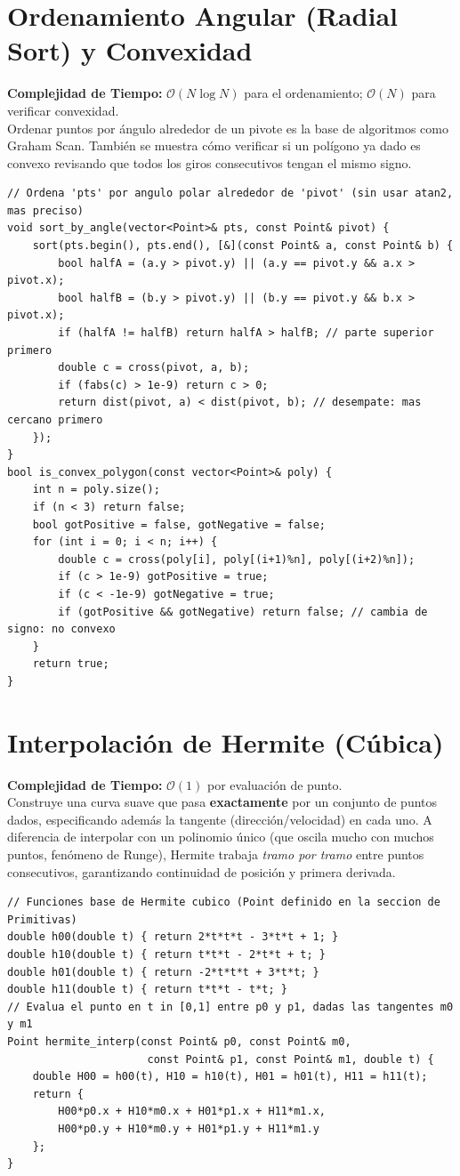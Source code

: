 \documentclass[10pt,twocolumn,letterpaper]{report}
\begin{document}
\section{Ordenamiento Angular (Radial Sort) y Convexidad}
\textbf{Complejidad de Tiempo:} $\mathcal{O}(N \log N)$ para el ordenamiento; $\mathcal{O}(N)$ para verificar convexidad. \\
Ordenar puntos por ángulo alrededor de un pivote es la base de algoritmos como Graham Scan. También se muestra cómo verificar si un polígono ya dado es convexo revisando que todos los giros consecutivos tengan el mismo signo.
\begin{lstlisting}
// Ordena 'pts' por angulo polar alrededor de 'pivot' (sin usar atan2, mas preciso)
void sort_by_angle(vector<Point>& pts, const Point& pivot) {
    sort(pts.begin(), pts.end(), [&](const Point& a, const Point& b) {
        bool halfA = (a.y > pivot.y) || (a.y == pivot.y && a.x > pivot.x);
        bool halfB = (b.y > pivot.y) || (b.y == pivot.y && b.x > pivot.x);
        if (halfA != halfB) return halfA > halfB; // parte superior primero
        double c = cross(pivot, a, b);
        if (fabs(c) > 1e-9) return c > 0;
        return dist(pivot, a) < dist(pivot, b); // desempate: mas cercano primero
    });
}
bool is_convex_polygon(const vector<Point>& poly) {
    int n = poly.size();
    if (n < 3) return false;
    bool gotPositive = false, gotNegative = false;
    for (int i = 0; i < n; i++) {
        double c = cross(poly[i], poly[(i+1)%n], poly[(i+2)%n]);
        if (c > 1e-9) gotPositive = true;
        if (c < -1e-9) gotNegative = true;
        if (gotPositive && gotNegative) return false; // cambia de signo: no convexo
    }
    return true;
}
\end{lstlisting}
\section{Interpolación de Hermite (Cúbica)}
\textbf{Complejidad de Tiempo:} $\mathcal{O}(1)$ por evaluación de punto. \\
Construye una curva suave que pasa \textbf{exactamente} por un conjunto de puntos dados, especificando además la tangente (dirección/velocidad) en cada uno. A diferencia de interpolar con un polinomio único (que oscila mucho con muchos puntos, fenómeno de Runge), Hermite trabaja \textit{tramo por tramo} entre puntos consecutivos, garantizando continuidad de posición y primera derivada.
\begin{lstlisting}
// Funciones base de Hermite cubico (Point definido en la seccion de Primitivas)
double h00(double t) { return 2*t*t*t - 3*t*t + 1; }
double h10(double t) { return t*t*t - 2*t*t + t; }
double h01(double t) { return -2*t*t*t + 3*t*t; }
double h11(double t) { return t*t*t - t*t; }
// Evalua el punto en t in [0,1] entre p0 y p1, dadas las tangentes m0 y m1
Point hermite_interp(const Point& p0, const Point& m0,
                      const Point& p1, const Point& m1, double t) {
    double H00 = h00(t), H10 = h10(t), H01 = h01(t), H11 = h11(t);
    return {
        H00*p0.x + H10*m0.x + H01*p1.x + H11*m1.x,
        H00*p0.y + H10*m0.y + H01*p1.y + H11*m1.y
    };
}
\end{lstlisting}
\end{document}
